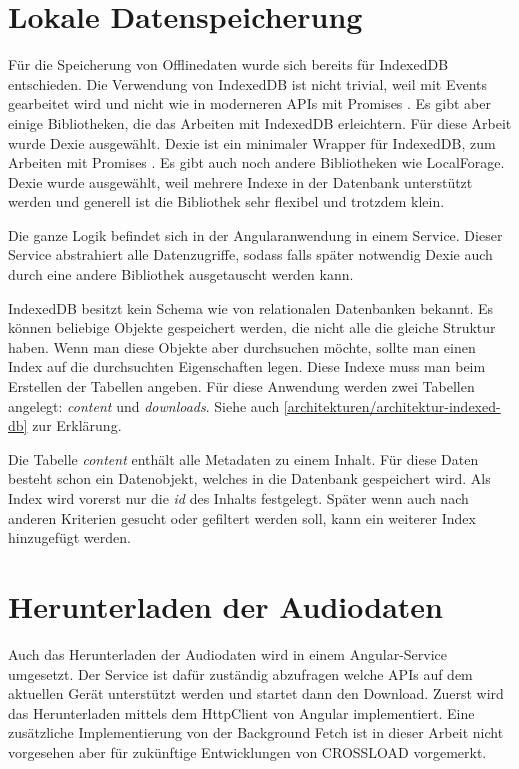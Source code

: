 \section{Lokale Datenspeicherung}
\label{Kap5:Speicherung}
Für die Speicherung von Offlinedaten wurde sich bereits für IndexedDB entschieden. Die Verwendung von IndexedDB ist nicht trivial, weil mit Events gearbeitet wird und nicht wie in moderneren APIs mit Promises \autocite{mdn-indexeddb}. Es gibt aber einige Bibliotheken, die das Arbeiten mit IndexedDB erleichtern. Für diese Arbeit wurde Dexie ausgewählt. Dexie ist ein minimaler Wrapper für IndexedDB, zum Arbeiten mit Promises \autocite{dexie}. Es gibt auch noch andere Bibliotheken wie LocalForage. Dexie wurde ausgewählt, weil mehrere Indexe in der Datenbank unterstützt werden und generell ist die Bibliothek sehr flexibel und trotzdem klein.

Die ganze Logik befindet sich in der Angularanwendung in einem Service. Dieser Service abstrahiert alle Datenzugriffe, sodass falls später notwendig Dexie auch durch eine andere Bibliothek ausgetauscht werden kann. 

IndexedDB besitzt kein Schema wie von relationalen Datenbanken bekannt. Es können beliebige Objekte gespeichert werden, die nicht alle die gleiche Struktur haben. Wenn man diese Objekte aber durchsuchen möchte, sollte man einen Index auf die durchsuchten Eigenschaften legen. Diese Indexe muss man beim Erstellen der Tabellen angeben. Für diese Anwendung werden zwei Tabellen angelegt: \emph{content} und \emph{downloads}. Siehe auch \autoref{architekturen/architektur-indexed-db} zur Erklärung.

Die Tabelle \emph{content} enthält alle Metadaten zu einem Inhalt. Für diese Daten besteht schon ein Datenobjekt, welches in die Datenbank gespeichert wird. Als Index wird vorerst nur die \emph{id} des Inhalts festgelegt. Später wenn auch nach anderen Kriterien gesucht oder gefiltert werden soll, kann ein weiterer Index hinzugefügt werden. 

\section{Herunterladen der Audiodaten}
Auch das Herunterladen der Audiodaten wird in einem Angular-Service umgesetzt. Der Service ist dafür zuständig abzufragen welche APIs auf dem aktuellen Gerät unterstützt werden und startet dann den Download. Zuerst wird das Herunterladen mittels dem HttpClient von Angular implementiert. Eine zusätzliche Implementierung von der Background Fetch ist in dieser Arbeit nicht vorgesehen aber für zukünftige Entwicklungen von CROSSLOAD vorgemerkt. 

